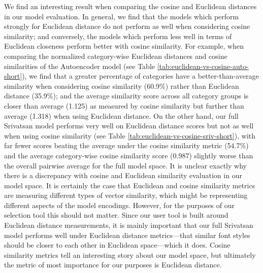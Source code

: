 We find an interesting result when comparing the cosine and Euclidean distances in our model evaluation. In general, we find that the models which perform strongly for Euclidean distance do not perform as well when considering cosine similarity; and conversely, the models which perform less well in terms of Euclidean closeness perform better with cosine similarity. For example, when comparing the normalized category-wise Euclidean distances and cosine similarities of the Autoencoder model (see Table \ref{tab:euclidean-vs-cosine-auto-short}), we find that a greater percentage of categories have a better-than-average similarity when considering cosine similarity (60.9\%) rather than Euclidean distance (35.9\%); and the average similarity score across all category groups is closer than average (1.125) as measured by cosine similarity but further than average (1.318) when using Euclidean distance. On the other hand, our full Srivatsan model performs very well on Euclidean distance scores but not as well when using cosine similarity (see Table \ref{tab:euclidean-vs-cosine-sriv-short}), with far fewer scores beating the average under the cosine similarity metric (54.7\%) and the average category-wise cosine similarity score (0.987) slightly worse than the overall pairwise average for the full model space. It is unclear exactly why there is a discrepancy with cosine and Euclidean similarity evaluation in our model space. It is certainly the case that Euclidean and cosine similarity metrics are measuring different types of vector similarity, which might be representing different aspects of the model encodings. However, for the purposes of our selection tool this should not matter. Since our user tool is built around Euclidean distance measurements, it is mainly important that our full Srivatsan model performs well under Euclidean distance metrics---that similar font styles should be closer to each other in Euclidean space---which it does. Cosine similarity metrics tell an interesting story about our model space, but ultimately the metric of most importance for our purposes is Euclidean distance.

